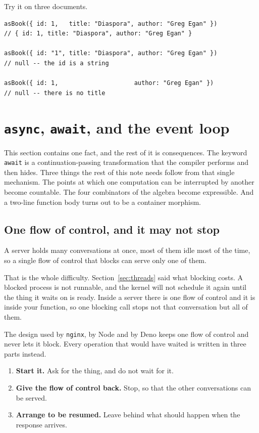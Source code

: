 \documentclass[11pt,a4paper]{article}
\begin{document}
\newpage

Try it on three documents.

\begin{lstlisting}[language=TS]
asBook({ id: 1,   title: "Diaspora", author: "Greg Egan" })
// { id: 1, title: "Diaspora", author: "Greg Egan" }

asBook({ id: "1", title: "Diaspora", author: "Greg Egan" })
// null -- the id is a string

asBook({ id: 1,                     author: "Greg Egan" })
// null -- there is no title
\end{lstlisting}

\newpage

\section{\texttt{async}, \texttt{await}, and the event loop}
\label{sec:async}

This section contains one fact, and the rest of it is consequences. The keyword \texttt{await} is a
continuation-passing transformation that the compiler performs and then hides. Three things the
rest of this note needs follow from that single mechanism. The points at which one computation can
be interrupted by another become countable. The four combinators of the algebra become expressible.
And a two-line function body turns out to be a container morphism.

\subsection{One flow of control, and it may not stop}
\label{sec:oneflow}

A server holds many conversations at once, most of them idle most of the time, so a single flow of
control that blocks can serve only one of them.

That is the whole difficulty. Section~\ref{sec:threads} said what blocking costs. A blocked process
is not runnable, and the kernel will not schedule it again until the thing it waits on is ready.
Inside a server there is one flow of control and it is inside your function, so one blocking call
stops not that conversation but all of them.

The design used by \texttt{nginx}, by Node and by Deno keeps one flow of control and never lets it
block. Every operation that would have waited is written in three parts instead.

\begin{enumerate}\setlength{\itemsep}{2pt}
\item \textbf{Start it.} Ask for the thing, and do not wait for it.
\item \textbf{Give the flow of control back.} Stop, so that the other conversations can be served.
\item \textbf{Arrange to be resumed.} Leave behind what should happen when the response arrives.
\end{enumerate}
\end{document}
